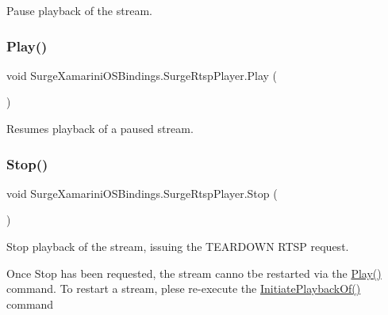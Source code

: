 Pause playback of the stream. 

\mbox{\label{interface_surge_xamarini_o_s_bindings_1_1_surge_rtsp_player_a3f7d8277f7aa65454732afd623ee53af}} 
\subsubsection{\texorpdfstring{Play()}{Play()}}
{\footnotesize\ttfamily void Surge\+Xamarini\+O\+S\+Bindings.\+Surge\+Rtsp\+Player.\+Play (\begin{DoxyParamCaption}{ }\end{DoxyParamCaption})}



Resumes playback of a paused stream. 

\mbox{\label{interface_surge_xamarini_o_s_bindings_1_1_surge_rtsp_player_ac4cb8b34437ee896e4529cddca339bed}} 
\subsubsection{\texorpdfstring{Stop()}{Stop()}}
{\footnotesize\ttfamily void Surge\+Xamarini\+O\+S\+Bindings.\+Surge\+Rtsp\+Player.\+Stop (\begin{DoxyParamCaption}{ }\end{DoxyParamCaption})}



Stop playback of the stream, issuing the T\+E\+A\+R\+D\+O\+WN R\+T\+SP request. 

Once Stop has been requested, the stream canno tbe restarted via the \hyperlink{interface_surge_xamarini_o_s_bindings_1_1_surge_rtsp_player_a3f7d8277f7aa65454732afd623ee53af}{Play()} command. To restart a stream, plese re-\/execute the \hyperlink{interface_surge_xamarini_o_s_bindings_1_1_surge_rtsp_player_a7c2572b559c1758415a21c0bde4417be}{Initiate\+Playback\+Of()} command 

